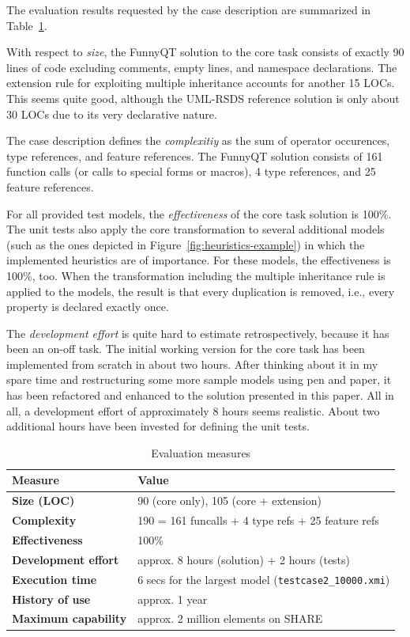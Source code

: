 \documentclass[11pt]{article}
\begin{document}
The evaluation results requested by the case description
\cite{cdrestructcasedesc} are summarized in Table~\ref{tab:evaluation}.

With respect to \emph{size}, the FunnyQT solution to the core task consists of
exactly 90 lines of code excluding comments, empty lines, and namespace
declarations.  The extension rule for exploiting multiple inheritance accounts
for another 15 LOCs.  This seems quite good, although the UML-RSDS reference
solution is only about 30 LOCs due to its very declarative nature.

The case description defines the \emph{complexitiy} as the sum of operator
occurences, type references, and feature references.  The FunnyQT solution
consists of 161 function calls (or calls to special forms or macros), 4 type
references, and 25 feature references.

For all provided test models, the \emph{effectiveness} of the core task
solution is 100\%.  The unit tests also apply the core transformation to
several additional models (such as the ones depicted in
Figure~\ref{fig:heuristics-example}) in which the implemented heuristics are of
importance.  For these models, the effectiveness is 100\%, too.  When the
transformation including the multiple inheritance rule is applied to the
models, the result is that every duplication is removed, i.e., every property
is declared exactly once.

The \emph{development effort} is quite hard to estimate retrospectively,
because it has been an on-off task.  The initial working version for the core
task has been implemented from scratch in about two hours.  After thinking
about it in my spare time and restructuring some more sample models using pen
and paper, it has been refactored and enhanced to the solution presented in
this paper.  All in all, a development effort of approximately 8 hours seems
realistic.  About two additional hours have been invested for defining the unit
tests.

\begin{table}[htb]
  \centering
  \begin{tabular}{| l | l |}
    \hline
    \textbf{Measure}            & \textbf{Value}\\
    \hline
    \textbf{Size (LOC)}         & 90 (core only), 105 (core + extension)\\
    \textbf{Complexity}         & 190 = 161 funcalls + 4 type refs + 25 feature refs\\
    \textbf{Effectiveness}      & 100\%\\
    \textbf{Development effort} & approx. 8 hours (solution) + 2 hours (tests)\\
    \textbf{Execution time}     & 6 secs for the largest model (\verb|testcase2_10000.xmi|)\\
    \textbf{History of use}     & approx. 1 year\\
    \textbf{Maximum capability} & approx. 2 million elements on SHARE\\
    \hline
  \end{tabular}
  \caption{Evaluation measures}
  \label{tab:evaluation}
\end{table}
\end{document}

